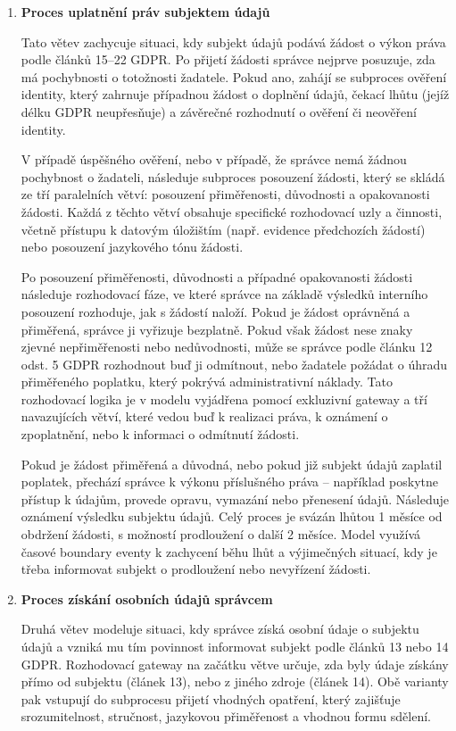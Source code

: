 \begin{enumerate}
  \item \textbf{Proces uplatnění práv subjektem údajů}

  Tato větev zachycuje situaci, kdy subjekt údajů podává žádost o výkon práva podle článků 15–22 GDPR. Po přijetí žádosti správce nejprve posuzuje, zda má pochybnosti o totožnosti žadatele. Pokud ano, zahájí se subproces ověření identity, který zahrnuje případnou žádost o doplnění údajů, čekací lhůtu (jejíž délku GDPR neupřesňuje) a závěrečné rozhodnutí o ověření či neověření identity.

  V případě úspěšného ověření, nebo v případě, že správce nemá žádnou pochybnost o žadateli, následuje subproces posouzení žádosti, který se skládá ze tří paralelních větví: posouzení přiměřenosti, důvodnosti a opakovanosti žádosti. Každá z těchto větví obsahuje specifické rozhodovací uzly a činnosti, včetně přístupu k datovým úložištím (např. evidence předchozích žádostí) nebo posouzení jazykového tónu žádosti.

  Po posouzení přiměřenosti, důvodnosti a případné opakovanosti žádosti následuje rozhodovací fáze, ve které správce na základě výsledků interního posouzení rozhoduje, jak s žádostí naloží. Pokud je žádost oprávněná a přiměřená, správce ji vyřizuje bezplatně. Pokud však žádost nese znaky zjevné nepřiměřenosti nebo nedůvodnosti, může se správce podle článku 12 odst. 5 GDPR rozhodnout buď ji odmítnout, nebo žadatele požádat o úhradu přiměřeného poplatku, který pokrývá administrativní náklady. Tato rozhodovací logika je v modelu vyjádřena pomocí exkluzivní gateway a tří navazujících větví, které vedou buď k realizaci práva, k oznámení o zpoplatnění, nebo k informaci o odmítnutí žádosti.

  Pokud je žádost přiměřená a důvodná, nebo pokud již subjekt údajů zaplatil poplatek, přechází správce k výkonu příslušného práva – například poskytne přístup k údajům, provede opravu, vymazání nebo přenesení údajů. Následuje oznámení výsledku subjektu údajů. Celý proces je svázán lhůtou 1 měsíce od obdržení žádosti, s možností prodloužení o další 2 měsíce. Model využívá časové boundary eventy k zachycení běhu lhůt a výjimečných situací, kdy je třeba informovat subjekt o prodloužení nebo nevyřízení žádosti.

  \item \textbf{Proces získání osobních údajů správcem}

  Druhá větev modeluje situaci, kdy správce získá osobní údaje o subjektu údajů a vzniká mu tím povinnost informovat subjekt podle článků 13 nebo 14 GDPR. Rozhodovací gateway na začátku větve určuje, zda byly údaje získány přímo od subjektu (článek 13), nebo z jiného zdroje (článek 14). Obě varianty pak vstupují do subprocesu přijetí vhodných opatření, který zajišťuje srozumitelnost, stručnost, jazykovou přiměřenost a vhodnou formu sdělení.


\end{enumerate}
